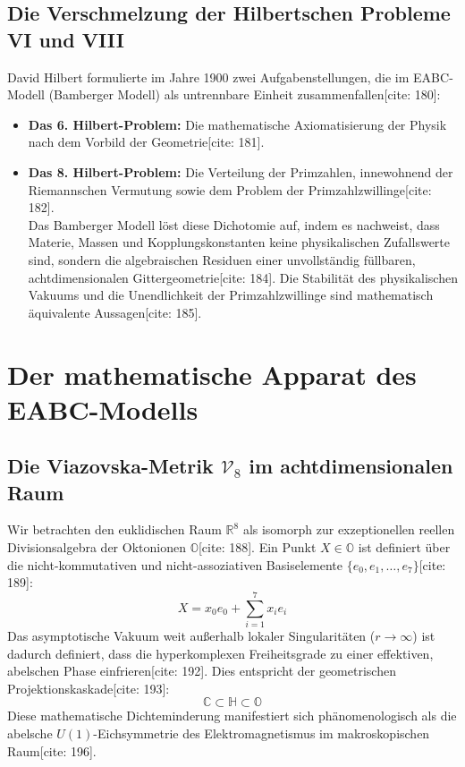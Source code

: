 \documentclass[11pt,a4paper]{article}
\newcommand{\R}{\mathbb{R}}
\newcommand{\C}{\mathbb{C}}
\newcommand{\Halg}{\mathbb{H}}
\newcommand{\Oalg}{\mathbb{O}}
\newcommand{\Vmet}{\mathcal{V}_8}
\theoremstyle{definition}
\begin{document}
	\subsection{Die Verschmelzung der Hilbertschen Probleme VI und VIII}
	David Hilbert formulierte im Jahre 1900 zwei Aufgabenstellungen, die im EABC-Modell (Bamberger Modell) als untrennbare Einheit zusammenfallen[cite: 180]:
	\begin{itemize}
		\item \textbf{Das 6. Hilbert-Problem:} Die mathematische Axiomatisierung der Physik nach dem Vorbild der Geometrie[cite: 181].
		\item \textbf{Das 8. Hilbert-Problem:} Die Verteilung der Primzahlen, innewohnend der Riemannschen Vermutung sowie dem Problem der Primzahlzwillinge[cite: 182].
		\\
		Das Bamberger Modell löst diese Dichotomie auf, indem es nachweist, dass Materie, Massen und Kopplungskonstanten keine physikalischen Zufallswerte sind, sondern die algebraischen Residuen einer unvollständig füllbaren, achtdimensionalen Gittergeometrie[cite: 184]. Die Stabilität des physikalischen Vakuums und die Unendlichkeit der Primzahlzwillinge sind mathematisch äquivalente Aussagen[cite: 185].
	\end{itemize}
	
	\section{Der mathematische Apparat des EABC-Modells}
	
	\subsection{Die Viazovska-Metrik $\Vmet$ im achtdimensionalen Raum}
	Wir betrachten den euklidischen Raum $\R^8$ als isomorph zur exzeptionellen reellen Divisionsalgebra der Oktonionen $\Oalg$[cite: 188]. Ein Punkt $X \in \Oalg$ ist definiert über die nicht-kommutativen und nicht-assoziativen Basiselemente $\{e_0, e_1, \dots, e_7\}$[cite: 189]:
	\begin{equation}
		X = x_0 e_0 + \sum_{i=1}^7 x_i e_i
	\end{equation}
	Das asymptotische Vakuum weit außerhalb lokaler Singularitäten ($r \rightarrow \infty$) ist dadurch definiert, dass die hyperkomplexen Freiheitsgrade zu einer effektiven, abelschen Phase einfrieren[cite: 192]. Dies entspricht der geometrischen Projektionskaskade[cite: 193]:
	\begin{equation}
		\C \subset \Halg \subset \Oalg
	\end{equation}
	Diese mathematische Dichteminderung manifestiert sich phänomenologisch als die abelsche $U(1)$-Eichsymmetrie des Elektromagnetismus im makroskopischen Raum[cite: 196].
	
\end{document}
